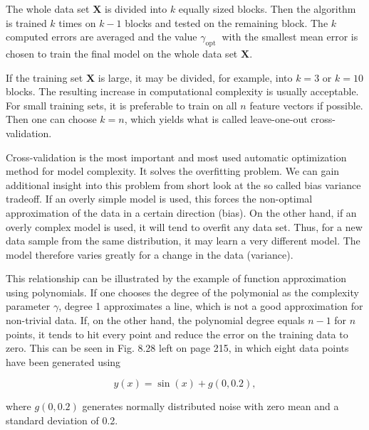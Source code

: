 \documentclass[10pt]{article}
\begin{document}
The whole data set $\boldsymbol{X}$ is divided into $k$ equally sized blocks. Then the algorithm is trained $k$ times on $k-1$ blocks and tested on the remaining block. The $k$ computed errors are averaged and the value $\gamma_{\text {opt }}$ with the smallest mean error is chosen to train the final model on the whole data set $\boldsymbol{X}$.

If the training set $\boldsymbol{X}$ is large, it may be divided, for example, into $k=3$ or $k=10$ blocks. The resulting increase in computational complexity is usually acceptable. For small training sets, it is preferable to train on all $n$ feature vectors if possible. Then one can choose $k=n$, which yields what is called leave-one-out cross-validation.

Cross-validation is the most important and most used automatic optimization method for model complexity. It solves the overfitting problem. We can gain additional insight into this problem from short look at the so called bias variance tradeoff. If an overly simple model is used, this forces the non-optimal approximation of the data in a certain direction (bias). On the other hand, if an overly complex model is used, it will tend to overfit any data set. Thus, for a new data sample from the same distribution, it may learn a very different model. The model therefore varies greatly for a change in the data (variance).

This relationship can be illustrated by the example of function approximation using polynomials. If one chooses the degree of the polymonial as the complexity parameter $\gamma$, degree 1 approximates a line, which is not a good approximation for non-trivial data. If, on the other hand, the polynomial degree equals $n-1$ for $n$ points, it tends to hit every point and reduce the error on the training data to zero. This can be seen in Fig. 8.28 left on page 215, in which eight data points have been generated using

$$
y(x)=\sin (x)+g(0,0.2),
$$

where $g(0,0.2)$ generates normally distributed noise with zero mean and a standard deviation of 0.2.
\end{document}
